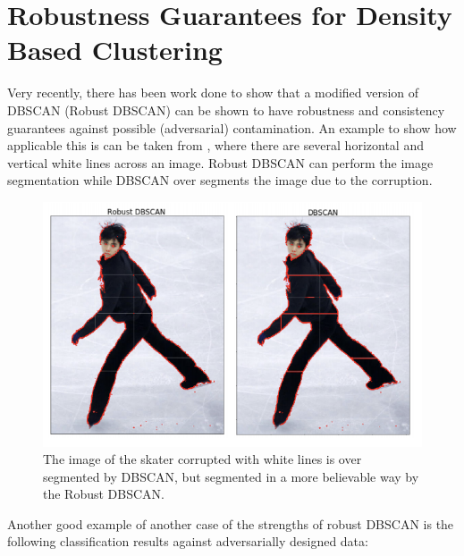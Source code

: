 \section{Robustness Guarantees for Density Based Clustering}
    
    Very recently, there has been work done to show that a modified version of DBSCAN (Robust DBSCAN) can be shown to have robustness and consistency guarantees against possible (adversarial) contamination. An example to show how applicable this is can be taken from \cite{pmlr-v89-jiang19a}, where there are several horizontal and vertical white lines across an image. Robust DBSCAN can perform the image segmentation while DBSCAN over segments the image due to the corruption.
    
    \begin{figure}[H]
        \centering
        \includegraphics{chapter_2/files/Robustness_Skater_Example.png}
        \caption{The image of the skater corrupted with white lines is over segmented by DBSCAN, but segmented in a more believable way by the Robust DBSCAN.}
        \label{fig:robust_skater}
    \end{figure}
    
    
    Another good example of another case of the strengths of robust DBSCAN is the following classification results against adversarially designed data:
    
